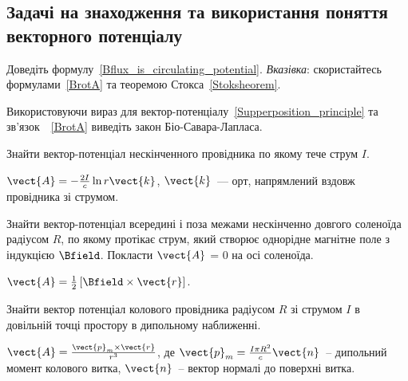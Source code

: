 \subsection*{Задачі на знаходження та використання поняття векторного потенціалу}

\begin{problem}
    Доведіть формулу~\ref{Bflux_is_circulating_potential}.
	\emph{Вказівка}: скористайтесь формулами~\eqref{BrotA} та теоремою Стокса~\eqref{Stoksheorem}.
\end{problem}

\begin{problem}
    Використовуючи вираз для вектор-потенціалу~\eqref{Supperposition_principle} та зв'язок~~\eqref{BrotA} виведіть закон Біо-Савара-Лапласа.
\end{problem}



\begin{problem}
Знайти вектор-потенціал нескінченного провідника по якому тече струм $I$.
\begin{solution}
	$\vect{A} =-  \frac{2I}{c}\ln r \vect{k}$, $\vect{k}$~--- орт, напрямлений вздовж провідника зі струмом.
\end{solution}
\end{problem}

\begin{problem}
Знайти вектор-потенціал всередині і поза межами нескінченно довгого  соленоїда радіусом $R$, по якому протікає струм, який створює  однорідне магнітне поле з індукцією $\Bfield$. Покласти $\vect{A}$ = 0 на осі соленоїда.
\begin{solution}
	$\vect{A} = \frac12 \left[ \Bfield\times \vect{r} \right] $.
\end{solution}
\end{problem}

\begin{problem}
    Знайти вектор потенціал колового провідника радіусом $R$ зі струмом $I$ в довільній точці простору в дипольному наближенні. 
\begin{solution}
	$\vect{A} = \frac{\vect{p}_m\times\vect{r}}{r^3}$, де $\vect{p}_m = \frac{I\pi R^2}{c}\vect{n}$~-- дипольний момент колового витка, $\vect{n}$~-- вектор нормалі до поверхні витка.
\end{solution}
\end{problem}


